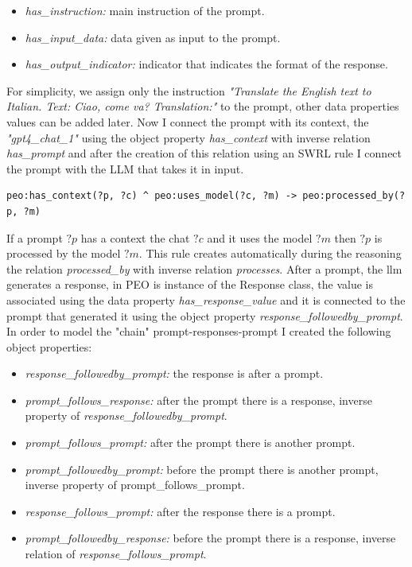 \begin{itemize}
    \item \textit{has\_instruction:} main instruction of the prompt.

    \item \textit{has\_input\_data:} data given as input to the prompt. 

    \item \textit{has\_output\_indicator:} indicator that indicates the format of the response.
\end{itemize}
For simplicity, we assign only the instruction \textit{"Translate the English text to Italian. Text: Ciao, come va? Translation:"} to the prompt, other data properties values can be added later. Now I connect the prompt with its context, the \textit{"gpt4\_chat\_1"} using the object property \textit{has\_context} with inverse relation \textit{has\_prompt} and after the creation of this relation using an SWRL rule I connect the prompt with the LLM that takes it in input. 
\begin{lstlisting}
peo:has_context(?p, ?c) ^ peo:uses_model(?c, ?m) -> peo:processed_by(?p, ?m)   
\end{lstlisting}
If a prompt $?p$ has a context the chat $?c$ and it uses the model $?m$ then $?p$ is processed by the model $?m$. This rule creates automatically during the reasoning the relation \textit{processed\_by} with inverse relation \textit{processes}. After a prompt, the llm generates a response, in PEO is instance of the Response class, the value is associated using the data property \textit{has\_response\_value} and it is connected to the prompt that generated it using the object property \textit{response\_followedby\_prompt}. In order to model the "chain" prompt-responses-prompt I created the following object properties:
\begin{itemize}
    \item \textit{response\_followedby\_prompt:} the response is after a prompt.

    \item \textit{prompt\_follows\_response:} after the prompt there is a response, inverse property of \textit{response\_followedby\_prompt}.

    \item \textit{prompt\_follows\_prompt:} after the prompt there is another prompt.

    \item \textit{prompt\_followedby\_prompt:} before the prompt there is another prompt, inverse property of {prompt\_follows\_prompt}.

    \item \textit{response\_follows\_prompt:} after the response there is a prompt.

    \item \textit{prompt\_followedby\_response:} before the prompt there is a response, inverse relation of \textit{response\_follows\_prompt}. 
\end{itemize}
